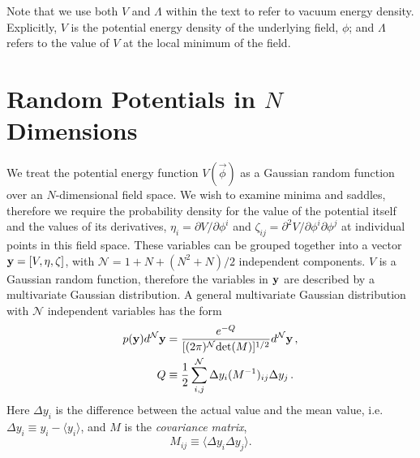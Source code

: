 \documentclass[12pt]{article}
\begin{document}
Note that we use both $V$ and $\Lambda$ within the text to refer to vacuum energy density. Explicitly, $V$ is the potential energy density of the underlying field, $\phi$; and $\Lambda$ refers to the value of $V$ at the local minimum of the field.
 
 
\section{Random Potentials in $N$ Dimensions}

We treat the potential energy function $V({\vec{\phi}})$ as a Gaussian random function over an $N$-dimensional field space. We wish to examine minima and saddles, therefore we require the probability density for the value of the potential itself and the values of its derivatives, $\eta_i = \partial V/\partial \phi^i$ and $\zeta_{ij}=\partial^2 V/\partial \phi^i\partial \phi^j$ at individual points in this field space. These variables can be grouped together into a vector ${\bf y} = [V,\eta,\zeta]$, with $\mathcal{N}=1+N+(N^2+N)/2$ independent components. $V$ is a Gaussian random function, therefore the variables in ${\bf y}$ are described by a multivariate Gaussian distribution. A general multivariate Gaussian distribution with $\mathcal{N}$ independent variables has the form
\begin{equation} \label{MultivariateGaussian}
\begin{split}
p({\bf y})d^\mathcal{N}{\bf y} &= \frac{e^{-Q}}{[(2\pi)^\mathcal{N} \mathrm{det}(M)]^{1/2}} d^\mathcal{N}{\bf y} \, ,\\
Q &\equiv \frac{1}{2} \sum_{i,j}^\mathcal{N} \Delta y_i (M^{-1})_{ij} \Delta y_{j} \, .\\
\end{split}
\end{equation}
%
Here $\Delta y_i$ is the difference between the actual value and the mean value, i.e. $\Delta y_i \equiv y_i - \langle y_i \rangle$, and $M$ is the \emph{covariance matrix}, 
%
\begin{equation}
M_{ij} \equiv \langle \Delta y_i \Delta y_j \rangle.
\end{equation}
%
\end{document}
